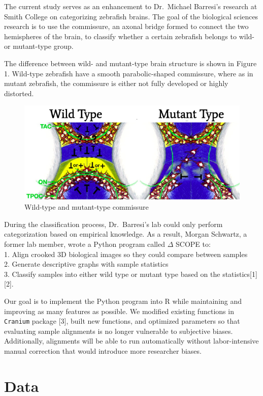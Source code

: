 \documentclass[10pt,letterpaper]{article}
\begin{document}
The current study serves as an enhancement to Dr.~Michael Barresi's
research at Smith College on categorizing zebrafish brains. The goal of
the biological sciences research is to use the commissure, an axonal
bridge formed to connect the two hemispheres of the brain, to classify
whether a certain zebrafish belongs to wild- or mutant-type group.

The difference between wild- and mutant-type brain structure is shown in
Figure 1. Wild-type zebrafish have a smooth parabolic-shaped commissure,
where as in mutant zebrafish, the commissure is either not fully
developed or highly distorted.

\begin{figure}[H]
\includegraphics[width=0.9\linewidth]{visualization_paper/wt_yt} \caption{Wild-type and mutant-type commissure}\label{fig:Figure1}
\end{figure}

During the classification process, Dr.~Barresi's lab could only perform
categorization based on empirical knowledge. As a result, Morgan
Schwartz, a former lab member, wrote a Python program called \(\Delta\)
SCOPE to:\\
1. Align crooked 3D biological images so they could compare between
samples\\
2. Generate descriptive graphs with sample statistics\\
3. Classify samples into either wild type or mutant type based on the
statistics{[}1{]} {[}2{]}.

Our goal is to implement the Python program into R while maintaining and
improving as many features as possible. We modified existing functions
in \texttt{Cranium} package {[}3{]}, built new functions, and optimized
parameters so that evaluating sample alignments is no longer vulnerable
to subjective biases. Additionally, alignments will be able to run
automatically without labor-intensive manual correction that would
introduce more researcher biases.

\hypertarget{data}{%
\section{Data}\label{data}}
\end{document}
